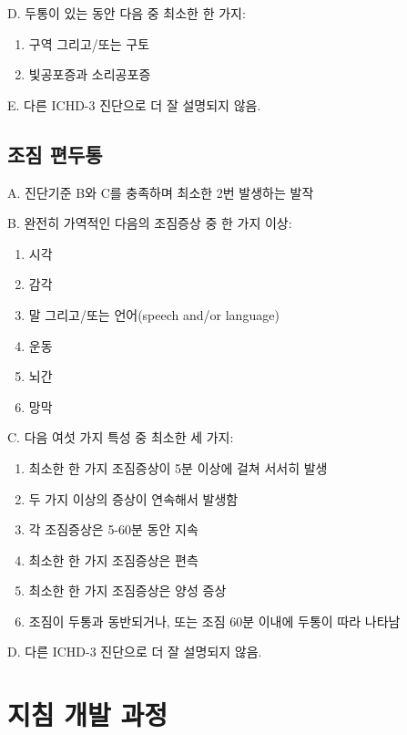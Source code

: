 \documentclass[]{book}
\providecommand{\tightlist}{%
  \setlength{\itemsep}{0pt}\setlength{\parskip}{0pt}}
\begin{document}
D. 두통이 있는 동안 다음 중 최소한 한 가지:

\begin{enumerate}
\def\labelenumi{\arabic{enumi}.}
\tightlist
\item
  구역 그리고/또는 구토
\item
  빛공포증과 소리공포증
\end{enumerate}

E. 다른 ICHD-3 진단으로 더 잘 설명되지 않음.

\hypertarget{section-26}{%
\section*{조짐 편두통}\label{section-26}}

A. 진단기준 B와 C를 충족하며 최소한 2번 발생하는 발작

B. 완전히 가역적인 다음의 조짐증상 중 한 가지 이상:

\begin{enumerate}
\def\labelenumi{\arabic{enumi}.}
\tightlist
\item
  시각
\item
  감각
\item
  말 그리고/또는 언어(speech and/or language)
\item
  운동
\item
  뇌간
\item
  망막
\end{enumerate}

C. 다음 여섯 가지 특성 중 최소한 세 가지:

\begin{enumerate}
\def\labelenumi{\arabic{enumi}.}
\tightlist
\item
  최소한 한 가지 조짐증상이 5분 이상에 걸쳐 서서히 발생
\item
  두 가지 이상의 증상이 연속해서 발생함
\item
  각 조짐증상은 5-60분 동안 지속
\item
  최소한 한 가지 조짐증상은 편측
\item
  최소한 한 가지 조짐증상은 양성 증상
\item
  조짐이 두통과 동반되거나, 또는 조짐 60분 이내에 두통이 따라 나타남
\end{enumerate}

D. 다른 ICHD-3 진단으로 더 잘 설명되지 않음.

\hypertarget{section-27}{%
\chapter{지침 개발 과정}\label{section-27}}
\end{document}
